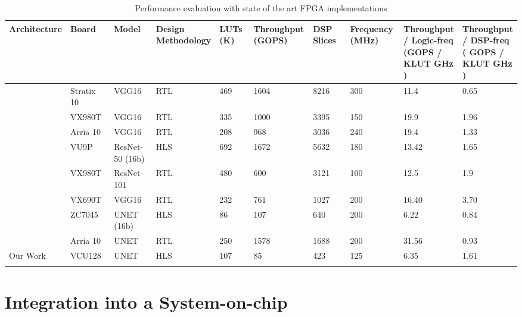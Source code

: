 \documentclass[a4paper,12pt, final]{report}
\begin{document}
\begin{table}
	\resizebox{\textwidth}{!}
	{\centering

\setlength{\tabcolsep}{1pt}
		\begin{tabular}{P{0.12\linewidth} P{0.12\linewidth} P{0.12\linewidth} P{0.08\linewidth} P{0.09\linewidth} P{0.12\linewidth} P{0.12\linewidth} P{0.12\linewidth} P{0.15\linewidth} P{0.15\linewidth}}
		\toprule
			Architecture & Board & Model & Design Methodology & LUTs (K) & Throughput (GOPS) & DSP Slices & Frequency (MHz) & Throughput / Logic-freq (GOPS / KLUT GHz ) & Throughput / DSP-freq ( GOPS / KLUT GHz )\\
		\toprule
			\cite{29} & Stratix 10 & VGG16 & RTL & 469 & 1604 & 8216 & 300 & 11.4 & 0.65\\\midrule
			\cite{28} & VX980T & VGG16 & RTL & 335 & 1000 & 3395 & 150 & 19.9 & 1.96\\\midrule
			\cite{29} & Arria 10 & VGG16 & RTL & 208 & 968 & 3036 & 240 & 19.4 & 1.33\\\midrule
			\cite{layerCons} & VU9P & ResNet-50 (16b) & HLS & 692 & 1672 & 5632 & 180 & 13.42 & 1.65\\\midrule
			\cite{28} & VX980T & ResNet-101 & RTL & 480 & 600 & 3121 & 100 & 12.5 & 1.9\\\midrule
			\cite{BFP} & VX690T & VGG16 & RTL & 232 &  761 & 1027 & 200 & 16.40 & 3.70\\\midrule
			\cite{citeUNET1} & ZC7045 & UNET (16b) & HLS & 86 & 107 & 640 & 200 & 6.22 & 0.84\\\midrule
			\cite{citeUNET2} & Arria 10 & UNET & RTL & 250 & 1578 & 1688 & 200 & 31.56 & 0.93\\\midrule
			Our Work & VCU128 & UNET & HLS  & 107 & 85 & 423 & 125 & 6.35 & 1.61\\ 
		\bottomrule
		\\
	\end{tabular}
	}
	 \caption{Performance evaluation with state of the art FPGA implementations}
	 \label{tab:works}
\end{table}


\chapter{Integration into a System-on-chip}
\end{document}

